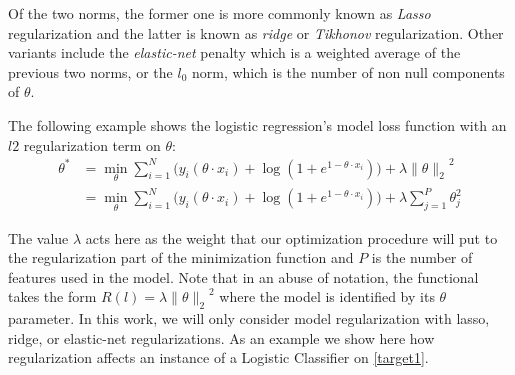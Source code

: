 Of the two norms, the former one is more commonly known as \textit{ Lasso} regularization and the latter is known as \textit{ridge} or \textit{Tikhonov} regularization.
Other variants include the \textit{elastic-net} penalty which is a weighted average of the previous two norms, or the $l_0$ norm, which is the number of non null components of $\theta$.


The following example shows the logistic regression's model loss function with an $l2$ regularization term on $\theta$:
\begin{equation}
\begin{split}
\theta^* & =  \min_{\theta} \sum_{i=1}^N \big(y_i ( \theta \cdot x_i ) + \log(1 + e^{1- \theta \cdot x_i} ) \big) + \lambda { \| \theta \|_{2}}^2 \\
		& = \min_{\theta} \sum_{i=1}^N \big(y_i ( \theta \cdot x_i ) + \log(1 + e^{1- \theta \cdot x_i} ) \big) + \lambda \sum_{j=1}^P \theta_j^2
\end{split}
\label{eq:logitRegularization}
\end{equation}




The value $\lambda$ acts here as the weight that our optimization procedure will put to the regularization part of the minimization function and $P$ is the number of features used in the model.
Note that in an abuse of notation, the functional takes the form $R(l) = \lambda { \| \theta \|_{2}}^2$ where the model is identified by its $\theta$ parameter.
In this work, we will only consider model regularization with lasso, ridge, or elastic-net regularizations.
As an example we show here how regularization affects an instance of a Logistic Classifier on \cref{target1}.



